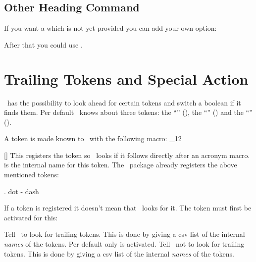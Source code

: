 \documentclass[load-preamble+,scrartcl={DIV10}]{cnltx-doc}
\makeatletter
\renewenvironment{commands}
  {%
    \cnltx@set@catcode_{12}%
    \let\command\cnltx@command
    \cnltxlist
  }
  {\endcnltxlist}
\makeatother
\begin{document}
\subsection{Other Heading Command}
If you want a  which is not yet provided you can add your
own option:
After that you could use .

\section{Trailing Tokens and Special Action}

\acro\ has the possibility to look ahead for certain tokens
and switch a boolean if it finds them.  Per default \acro\ knows about three
tokens: the \enquote{} (), the \enquote{}
(\code{-}) and the \enquote{} ().

A token is made known to \acro\ with the following macro:
\begin{commands}
  \command{AcroRegisterTrailing}[]
    This registers the token  so \acro\ looks if it follows
    directly after an acronym macro.   is the internal name for
    this token.
\end{commands}
The \acro\ package already registers the above mentioned tokens:
\begin{sourcecode}
  \AcroRegisterTrailing . {dot}
  \AcroRegisterTrailing - {dash}
  \AcroRegisterTrailing {}
\end{sourcecode}

If a token is registered it doesn't mean that \acro\ looks for it.  The token
must first be activated for this:
\begin{options}
    Tell \acro\ to look for trailing tokens.  This is done by giving a csv
    list of the internal \emph{names} of the tokens.  Per default only
     is activated.
    Tell \acro\ not to look for trailing tokens.  This is done by giving a csv
    list of the internal \emph{names} of the tokens.
\end{options}
\end{document}
